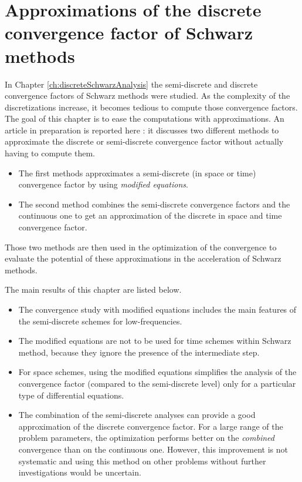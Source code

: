 \chapter{Approximations of the discrete convergence factor of Schwarz methods }
\label{ch:approximatedDiscreteSchwarz}
\minitoc
In Chapter \ref{ch:discreteSchwarzAnalysis} the semi-discrete and
discrete convergence factors of Schwarz methods were studied.
As the complexity of the discretizations increase, it becomes
tedious to compute those convergence factors.
The goal of this chapter
is to ease the computations with approximations.
An article in preparation is reported here :
it discusses two different methods to approximate the discrete
or semi-discrete convergence factor without actually having to
compute them.
\begin{itemize}
\item The first methods approximates a semi-discrete
(in space or time) convergence factor by using
\textit{modified equations}.
\item The second method combines the semi-discrete convergence
factors and the continuous one to get an approximation of the
discrete in space and time convergence factor.
\end{itemize}
Those two methods are then used in the optimization of the
convergence to evaluate the potential of these approximations
in the acceleration of Schwarz methods.
\par
The main results of this chapter are listed below.
\begin{itemize}
\item The convergence study with modified equations
	includes the main features of the semi-discrete
		schemes for low-frequencies.
\item The modified equations are not to be used for
	time schemes within Schwarz method, because they ignore
		the presence of the intermediate step.
\item For space schemes, using the modified equations simplifies
	the analysis of the convergence factor
	(compared to the semi-discrete level) only
	for a particular type of differential equations.
\item The combination of the semi-discrete analyses can provide
	a good approximation of the discrete convergence factor.
	For a large range of the problem parameters,
	the optimization performs better on the \textit{combined}
	convergence than on the continuous one. However,
	this improvement is not systematic and using this method
	on other problems without further investigations
	would be uncertain.
\end{itemize}

